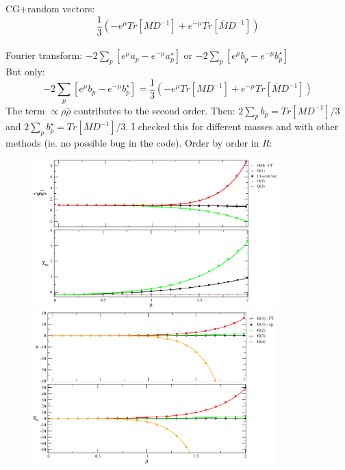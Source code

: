 \documentclass[a4paper,10pt]{report}
\newcommand{\ol}[1]{\overline{#1}}
\newcommand{\rrb}{\overline{\rho}}
\newcommand{\rr}{\rho}
\newcommand{\emu}{e^{\mu}}
\newcommand{\emmu}{e^{-\mu}}
\newcommand{\Mb}{\ol{M}}
\newcommand{\D}{D^{-1}}
\begin{document}
\begin{itemize}
\vspace*{2mm}
 CG+random vectors:  $$\frac{1}{3}(- \emu Tr[M\D]  + \emmu Tr[\Mb\D])$$
 \vspace*{2mm}
 \\Fourier transform:  $-2 \sum_{p} [\emu a_{p} - \emmu a_{p}^{\star}] $  or $-2 \sum_{p} [\emu b_{p} - \emmu b_{p}^{\star}] $
\vspace*{2mm}
\\But only: $$-2 \sum_{p} [\emu b_{p} - \emmu b_{p}^{\star}]  = \frac{1}{3}(- \emu Tr[M\D]  + \emmu Tr[\Mb\D])$$
The term $\propto \rr\rrb$ contributes to the second order.  
Then: $2 \sum_{p} b_p = Tr[M\D]/3$ and $2 \sum_{p} b_p^\star = Tr[\Mb\D]/3$.
I checked this for different masses and with other methods (ie. no possible bug in the code).
Order by order in $R$:
\end{itemize}

\begin{figure}[h]
\centering
\includegraphics[width=0.85\textwidth,clip]{./mass_free}
\includegraphics[width=0.84\textwidth,clip]{./mu_free}
\end{figure}
\end{document}
